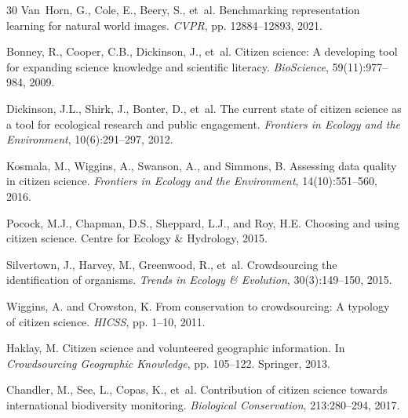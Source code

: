 \documentclass[11pt,a4paper]{article}
\begin{document}
\begin{thebibliography}{30}
Van~Horn, G., Cole, E., Beery, S., et~al.
\newblock Benchmarking representation learning for natural world images.
\newblock \emph{CVPR}, pp. 12884--12893, 2021.

Bonney, R., Cooper, C.B., Dickinson, J., et~al.
\newblock Citizen science: A developing tool for expanding science knowledge
  and scientific literacy.
\newblock \emph{BioScience}, 59(11):977--984, 2009.

Dickinson, J.L., Shirk, J., Bonter, D., et~al.
\newblock The current state of citizen science as a tool for ecological
  research and public engagement.
\newblock \emph{Frontiers in Ecology and the Environment}, 10(6):291--297, 2012.

Kosmala, M., Wiggins, A., Swanson, A., and Simmons, B.
\newblock Assessing data quality in citizen science.
\newblock \emph{Frontiers in Ecology and the Environment}, 14(10):551--560, 2016.

Pocock, M.J., Chapman, D.S., Sheppard, L.J., and Roy, H.E.
\newblock Choosing and using citizen science.
\newblock Centre for Ecology \& Hydrology, 2015.

Silvertown, J., Harvey, M., Greenwood, R., et~al.
\newblock Crowdsourcing the identification of organisms.
\newblock \emph{Trends in Ecology \& Evolution}, 30(3):149--150, 2015.

Wiggins, A. and Crowston, K.
\newblock From conservation to crowdsourcing: A typology of citizen science.
\newblock \emph{HICSS}, pp. 1--10, 2011.

Haklay, M.
\newblock Citizen science and volunteered geographic information.
\newblock In \emph{Crowdsourcing Geographic Knowledge}, pp. 105--122.
  Springer, 2013.

Chandler, M., See, L., Copas, K., et~al.
\newblock Contribution of citizen science towards international biodiversity
  monitoring.
\newblock \emph{Biological Conservation}, 213:280--294, 2017.

\end{thebibliography}
\end{document}
